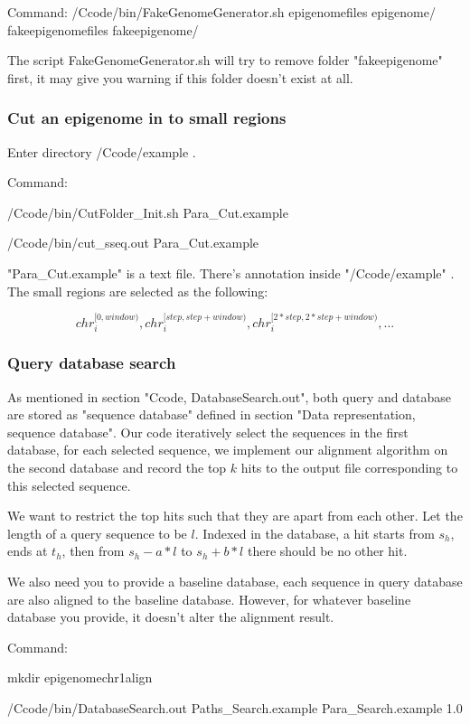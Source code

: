 \documentclass[a4paper]{article}
\begin{document}
\begin{CJK*}{UTF8}{kai}
Command: /Ccode/bin/FakeGenomeGenerator.sh epigenomefiles epigenome/ fakeepigenomefiles fakeepigenome/

The script FakeGenomeGenerator.sh will try to remove folder "fakeepigenome" first, it may give you warning if this folder doesn't exist at all.

\subsubsection{Cut an epigenome in to small regions}

Enter directory /Ccode/example .

Command: 

/Ccode/bin/CutFolder\_Init.sh Para\_Cut.example

/Ccode/bin/cut\_sseq.out Para\_Cut.example

"Para\_Cut.example" is a text file. There's annotation inside "/Ccode/example" . The small regions are selected as the following:

$$chr_i^{[0,window)}, chr_i^{[step,step+window)}, chr_i^{[2*step,2*step+window)},...$$

\subsubsection{Query database search}

As mentioned in section "Ccode, DatabaseSearch.out", both query and database are stored as "sequence database" defined in section "Data representation, sequence database". Our code iteratively select the sequences in the first database, for each selected sequence, we implement our alignment algorithm on the second database and record the top $k$ hits to the output file corresponding to this selected sequence.

We want to restrict the top hits such that they are apart from each other. Let the length of a query sequence to be $l$. Indexed in the database, a hit starts from $s_h$, ends at $t_h$, then from $s_h-a*l$ to $s_h+b*l$ there should be no other hit. 

We also need you to provide a baseline database, each sequence in query database are also aligned to the baseline database. However, for whatever baseline database you provide, it doesn't alter the alignment result.

Command:

mkdir epigenomechr1align

/Ccode/bin/DatabaseSearch.out Paths\_Search.example Para\_Search.example 1.0


\end{CJK*}
\end{document}
